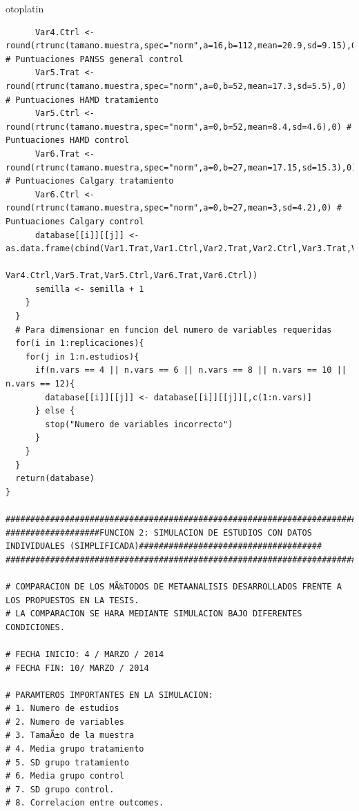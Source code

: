 otoplatin\documentclass[a4paper,openright,12pt]{report}
\begin{document}
{\begin{verbatim}
      Var4.Ctrl <- round(rtrunc(tamano.muestra,spec="norm",a=16,b=112,mean=20.9,sd=9.15),0) # Puntuaciones PANSS general control
      Var5.Trat <- round(rtrunc(tamano.muestra,spec="norm",a=0,b=52,mean=17.3,sd=5.5),0) # Puntuaciones HAMD tratamiento
      Var5.Ctrl <- round(rtrunc(tamano.muestra,spec="norm",a=0,b=52,mean=8.4,sd=4.6),0) # Puntuaciones HAMD control
      Var6.Trat <- round(rtrunc(tamano.muestra,spec="norm",a=0,b=27,mean=17.15,sd=15.3),0) # Puntuaciones Calgary tratamiento
      Var6.Ctrl <- round(rtrunc(tamano.muestra,spec="norm",a=0,b=27,mean=3,sd=4.2),0) # Puntuaciones Calgary control
      database[[i]][[j]] <- as.data.frame(cbind(Var1.Trat,Var1.Ctrl,Var2.Trat,Var2.Ctrl,Var3.Trat,Var3.Ctrl,Var4.Trat,
                                                Var4.Ctrl,Var5.Trat,Var5.Ctrl,Var6.Trat,Var6.Ctrl))
      semilla <- semilla + 1
    }
  }
  # Para dimensionar en funcion del numero de variables requeridas
  for(i in 1:replicaciones){
    for(j in 1:n.estudios){
      if(n.vars == 4 || n.vars == 6 || n.vars == 8 || n.vars == 10 || n.vars == 12){
        database[[i]][[j]] <- database[[i]][[j]][,c(1:n.vars)]
      } else {
        stop("Numero de variables incorrecto")
      }
    }
  }
  return(database)
}

###############################################################################################################################
###################FUNCION 2: SIMULACION DE ESTUDIOS CON DATOS INDIVIDUALES (SIMPLIFICADA)#####################################
###############################################################################################################################

# COMPARACION DE LOS MÃ‰TODOS DE METAANALISIS DESARROLLADOS FRENTE A LOS PROPUESTOS EN LA TESIS.
# LA COMPARACION SE HARA MEDIANTE SIMULACION BAJO DIFERENTES CONDICIONES.

# FECHA INICIO: 4 / MARZO / 2014
# FECHA FIN: 10/ MARZO / 2014

# PARAMTEROS IMPORTANTES EN LA SIMULACION:
# 1. Numero de estudios
# 2. Numero de variables
# 3. TamaÃ±o de la muestra
# 4. Media grupo tratamiento
# 5. SD grupo tratamiento
# 6. Media grupo control
# 7. SD grupo control.
# 8. Correlacion entre outcomes.


\end{verbatim}}
\end{document}
